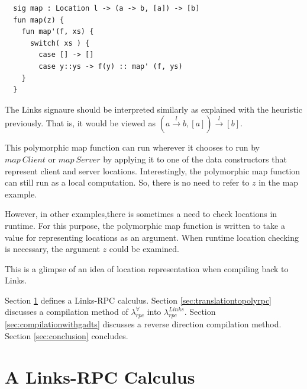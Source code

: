\documentclass[a4paper]{article}
\theoremstyle{plain}
\theoremstyle{definition}
\newcommand{\polyrpc}{$\lambda_{rpc}^{\forall}$\xspace}
\newcommand{\linksrpc}{$\lambda_{rpc}^{Links}$\xspace}
\newcommand{\funL}[1]{\xrightarrow{#1}}
\begin{document}
\begin{lstlisting}
  sig map : Location l -> (a -> b, [a]) -> [b]
  fun map(z) {
    fun map'(f, xs) {
      switch( xs ) {
        case [] -> []
        case y::ys -> f(y) :: map' (f, ys)
    }
  }
\end{lstlisting}

%
The Links signaure should be interpreted similarly as explained with
the heuristic previously.
%
That is, it would be viewed as $(a \funL{l} b, [a]) \funL{l} [b]$.
%

This polymorphic map function can run wherever it chooses to run by
$map \ Client$ or $map \ Server$ by applying it to one of the data
constructors that represent client and server locations.
%
Interestingly, the polymorphic map function can still run as a local
computation. 
%
So, there is no need to refer to $z$ in the map example.

However, in other examples,there is sometimes a need to check
locations in runtime.
%
For this purpose, the polymorphic map function is written to take a
value for representing locations as an argument.
%
When runtime location checking is necessary, the argument $z$ could be
examined.
%

%
This is a glimpse of an idea of location representation when
compiling back to Links.



%
Section \ref{sec:linksrpc} defines a Links-RPC calculus.
%
Section \ref{sec:translationtopolyrpc} discusses a compilation method
of \polyrpc into \linksrpc.
%
Section \ref{sec:compilationwithgadts} discusses a reverse direction
compilation method.
%
Section \ref{sec:conclusion} concludes.

\section{A Links-RPC Calculus}
\label{sec:linksrpc}
\end{document}
